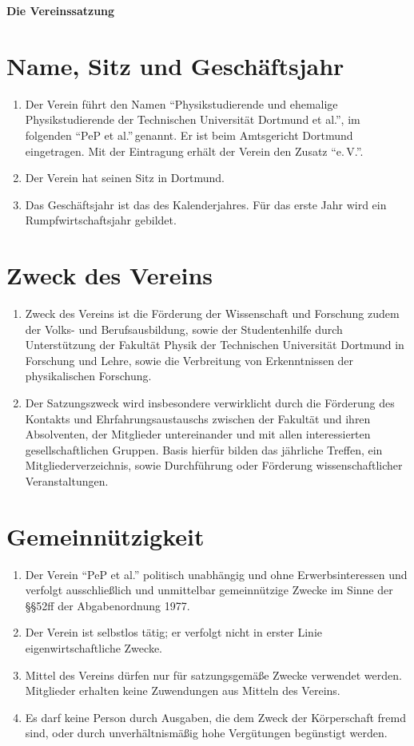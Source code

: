 \documentclass[
  fontsize=12pt,
  paper=a4,
  DIV14,
  parskip,
]{scrartcl}
\begin{document}
\textbf{\huge Die Vereinssatzung}

\section{Name, Sitz und Geschäftsjahr}

\begin{enumerate}
  \item Der Verein führt den Namen \enquote{Physikstudierende und ehemalige
    Physikstudierende der Technischen Universität Dortmund et al.}, im
    folgenden \enquote{PeP et al.}$\,$genannt. Er ist beim Amtsgericht
		Dortmund eingetragen. Mit der Eintragung erhält der Verein den Zusatz
    \enquote{e.\,V.}.
	\item Der Verein hat seinen Sitz in Dortmund.
	\item Das Geschäftsjahr ist das des Kalenderjahres. Für das erste Jahr wird
		ein Rumpfwirtschaftsjahr gebildet.
\end{enumerate}

\section{Zweck des Vereins}

\begin{enumerate}
	\item Zweck des Vereins ist die Förderung der Wissenschaft und Forschung zudem
		der Volks- und Berufsausbildung, sowie der Studentenhilfe durch Unterstützung
		der Fakultät Physik der Technischen Universität Dortmund in Forschung und
		Lehre, sowie die Verbreitung von Erkenntnissen der physikalischen Forschung.
	\item Der Satzungszweck wird insbesondere verwirklicht durch die Förderung
		des Kontakts und Ehrfahrungsaustauschs zwischen der Fakultät und ihren
		Absolventen, der Mitglieder untereinander und mit allen interessierten
		gesellschaftlichen Gruppen. Basis hierfür bilden das jährliche Treffen,
		ein Mitgliederverzeichnis, sowie Durchführung oder Förderung
		wissenschaftlicher Veranstaltungen.
\end{enumerate}

\section{Gemeinnützigkeit}

\begin{enumerate}
	\item Der Verein \enquote{PeP et al.} politisch unabhängig und ohne
		Erwerbsinteressen und verfolgt ausschließlich und unmittelbar gemeinnützige
		Zwecke im Sinne der §§52ff der Abgabenordnung 1977.
	\item Der Verein ist selbstlos tätig; er verfolgt nicht in erster Linie
		eigenwirtschaftliche Zwecke.
	\item Mittel des Vereins dürfen nur für satzungsgemäße Zwecke verwendet
		werden. Mitglieder erhalten keine Zuwendungen aus Mitteln des Vereins.
	\item Es darf keine Person durch Ausgaben, die dem Zweck der Körperschaft
		fremd sind, oder durch unverhältnismäßig hohe Vergütungen begünstigt werden.
\end{enumerate}
\end{document}
